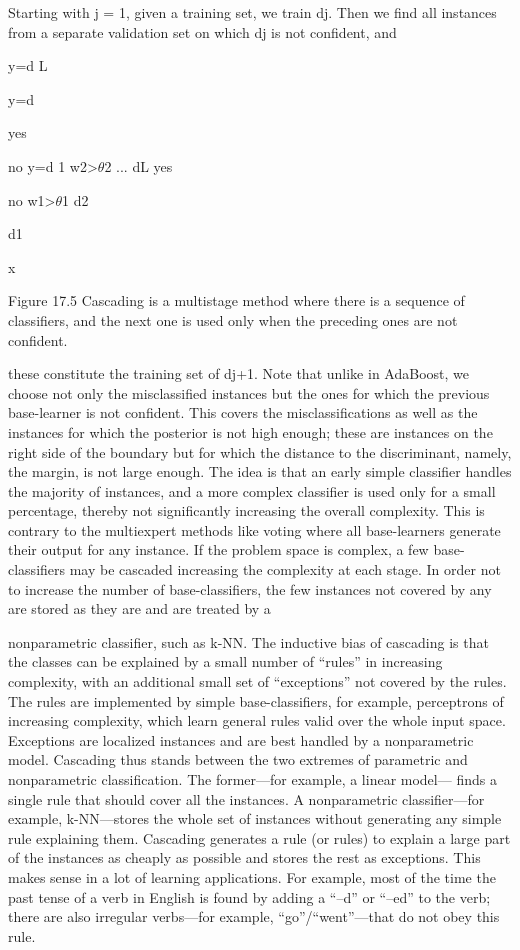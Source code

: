 Starting with j = 1, given a training set, we train dj. Then we find all instances from a separate validation set on which dj is not confident, and

y=d L

y=d

yes

no y=d 1 w2>$\theta$2 ... dL yes

no w1>$\theta$1 d2

d1

x

Figure 17.5 Cascading is a multistage method where there is a sequence of classifiers, and the next one is used only when the preceding ones are not confident.

these constitute the training set of dj+1. Note that unlike in AdaBoost, we choose not only the misclassified instances but the ones for which the previous base-learner is not confident. This covers the misclassifications as well as the instances for which the posterior is not high enough; these are instances on the right side of the boundary but for which the distance to the discriminant, namely, the margin, is not large enough. The idea is that an early simple classifier handles the majority of instances, and a more complex classifier is used only for a small percentage, thereby not significantly increasing the overall complexity. This is contrary to the multiexpert methods like voting where all base-learners generate their output for any instance. If the problem space is complex, a few base-classifiers may be cascaded increasing the complexity at each stage. In order not to increase the number of base-classifiers, the few instances not covered by any are stored as they are and are treated by a

nonparametric classifier, such as k-NN. The inductive bias of cascading is that the classes can be explained by a small number of “rules” in increasing complexity, with an additional small set of “exceptions” not covered by the rules. The rules are implemented by simple base-classifiers, for example, perceptrons of increasing complexity, which learn general rules valid over the whole input space. Exceptions are localized instances and are best handled by a nonparametric model. Cascading thus stands between the two extremes of parametric and nonparametric classification. The former---for example, a linear model--- finds a single rule that should cover all the instances. A nonparametric classifier---for example, k-NN---stores the whole set of instances without generating any simple rule explaining them. Cascading generates a rule (or rules) to explain a large part of the instances as cheaply as possible and stores the rest as exceptions. This makes sense in a lot of learning applications. For example, most of the time the past tense of a verb in English is found by adding a “--d” or “--ed” to the verb; there are also irregular verbs---for example, “go”/“went”---that do not obey this rule.

